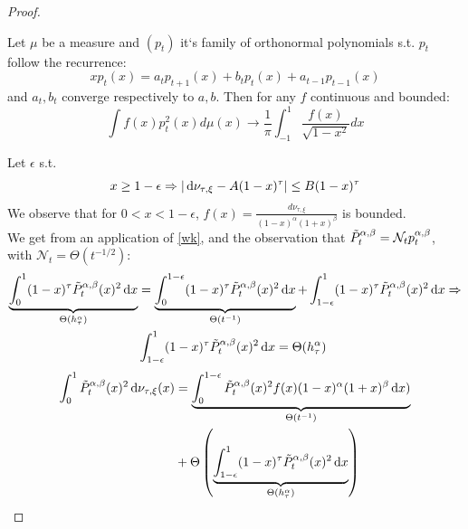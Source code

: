 \documentclass{article}
\begin{document}
\begin{proof}
\begin{lemma}
 Let $\mu$ be a measure and $(p_t)$ it`s family of orthonormal polynomials s.t.  $p_t$ follow the recurrence:
 \begin{equation*}
     xp_t(x)=a_tp_{t+1}(x)+b_tp_t(x)+a_{t-1}p_{t-1}(x)
 \end{equation*}
 and $a_t,b_t$ converge respectively to $a,b$. Then for any $f$  continuous and bounded:
\begin{equation}
    \int f(x)p_t^2(x)d\mu(x) \rightarrow \frac{1}{\pi}\int_{-1}^1 \frac{f(x)}{\sqrt{1-x^2}}dx   
\end{equation}
\label{wk}
\end{lemma} 
 Let $\epsilon$ s.t.
\begin{equation}
    x\geq 1-\epsilon \Rightarrow |\mathop{}\!\mathrm{d}\nu_{\tau,\xi}-A(1-x)^\tau|\leq  B(1-x)^\tau \label{eq: epsilon}
\end{equation}
We observe that for $0<x<1-\epsilon$, $f(x)=\frac{d\nu_{\tau,\xi}}{(1-x)^\alpha(1+x)^\beta}$ is bounded. \\
We get from an application of \ref{wk}, and the observation that $\Tilde{P}_t^{\alpha,\beta}=\mathcal{N}_tp_t^{\alpha,\beta}$, with $\mathcal{N}_t=\Theta(t^{-1/2})$:
\begin{align}
    \underbrace{\int_0^1(1-x)^\tau\Tilde{P}_t^{\alpha,\beta}(x)^2\mathop{}\!\mathrm{d} x}_{\Theta( h_\tau^\alpha)}&=\underbrace{\int_0^{1-\epsilon}(1-x)^\tau\Tilde{P}_t^{\alpha,\beta}(x)^2\mathop{}\!\mathrm{d} x}_{\Theta( t^{-1})
    } +\int_{1-\epsilon}^1(1-x)^\tau\Tilde{P}_t^{\alpha,\beta}(x)^2\mathop{}\!\mathrm{d} x \Rightarrow\\
    &\int_{1-\epsilon}^1(1-x)^\tau\Tilde{P}_t^{\alpha,\beta}(x)^2\mathop{}\!\mathrm{d} x  =\Theta( h_\tau^\alpha) 
    \end{align}
\begin{equation}
    \begin{split}
    \int_0^1 \Tilde{P}_t^{\alpha,\beta}(x)^2\mathop{}\!\mathrm{d}\nu_{\tau,\xi}(x)&=
    \underbrace{\int_0^{1-\epsilon} \Tilde{P}_t^{\alpha,\beta}(x)^2 f(x) (1-x)^\alpha(1+x)^\beta\mathop{}\!\mathrm{d} x)}_{\Theta( t^{-1})
    }\\
    &+\Theta\left(
    \underbrace{\int_{1-\epsilon}^1(1-x)^\tau\Tilde{P}_t^{\alpha,\beta}(x)^2\mathop{}\!\mathrm{d} x}_{\Theta( h_\tau^\alpha)}\right)
    \end{split}
\end{equation}


\end{proof}
\end{document}
